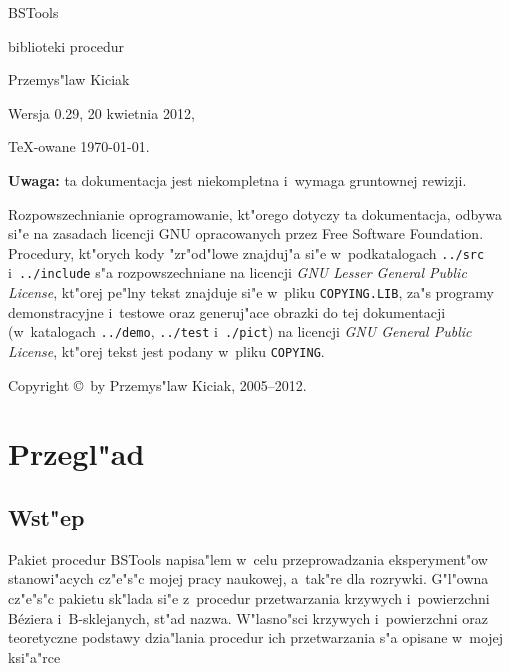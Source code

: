 

\thispagestyle{empty}
\vspace*{4.0cm}
\centerline{\Huge BSTools}
\vspace{0.75cm}
\centerline{\Huge biblioteki procedur}
\vspace{1.0cm}
\centerline{\Large Przemys"law Kiciak}
\vspace{1.0cm}
\centerline{\large Wersja 0.29, 20 kwietnia 2012,}
\vspace{\smallskipamount}
\centerline{\large\TeX-owane \today.}

\vspace{1.0cm}
\noindent
\textbf{Uwaga:} ta dokumentacja jest niekompletna
i~wymaga gruntownej rewizji.

\newpage
\thispagestyle{empty}
\vspace*{\fill}
\noindent
Rozpowszechnianie oprogramowanie, kt"orego dotyczy ta dokumentacja, odbywa
si"e na zasadach licencji GNU opracowanych przez Free Software Foundation.
Procedury, kt"orych kody "zr"od"lowe znajduj"a si"e w~podkatalogach
\texttt{../src} i~\texttt{../include} s"a rozpowszechniane
na licencji \textsl{GNU Lesser General Public License}, kt"orej pe"lny tekst
znajduje si"e w~pliku \texttt{COPYING.LIB}, za"s programy demonstracyjne
i~testowe oraz generuj"ace obrazki do tej dokumentacji (w~katalogach
\texttt{../demo}, \texttt{../test} i~\texttt{./pict}) na licencji
\textsl{GNU General Public License}, kt"orej tekst jest podany w~pliku
\texttt{COPYING}.

\vspace{\bigskipamount}
\noindent
Copyright \copyright\ by Przemys"law Kiciak, 2005--2012.

\vspace*{\fill}

\tableofcontents

\chapter{Przegl"ad}

\section{Wst"ep}

Pakiet procedur BSTools napisa"lem w~celu przeprowadzania eksperyment"ow
stanowi"acych cz"e"s"c mojej pracy naukowej, a~tak"re dla rozrywki.
G"l"owna cz"e"s"c pakietu sk"lada si"e z~procedur przetwarzania krzywych
i~powierzchni B\'{e}ziera i~B-sklejanych, st"ad nazwa. W"lasno"sci krzywych
i~powierzchni oraz teoretyczne podstawy dzia"lania procedur ich przetwarzania
s"a opisane w~mojej ksi"a"rce

